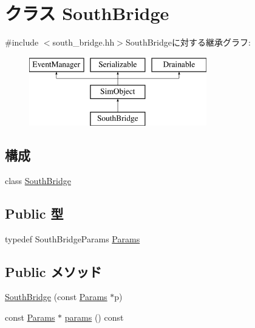 \hypertarget{classSouthBridge}{
\section{クラス SouthBridge}
\label{classSouthBridge}
}


{\ttfamily \#include $<$south\_\-bridge.hh$>$}SouthBridgeに対する継承グラフ:\begin{figure}[H]
\begin{center}
\leavevmode
\includegraphics[height=3cm]{classSouthBridge}
\end{center}
\end{figure}
\subsection*{構成}
\begin{DoxyCompactItemize}
\item 
class \hyperlink{classSouthBridge_1_1SouthBridge}{SouthBridge}
\end{DoxyCompactItemize}
\subsection*{Public 型}
\begin{DoxyCompactItemize}
\item 
typedef SouthBridgeParams \hyperlink{classSouthBridge_a627de7f454b8e2cbe120a7d6b67a4620}{Params}
\end{DoxyCompactItemize}
\subsection*{Public メソッド}
\begin{DoxyCompactItemize}
\item 
\hyperlink{classSouthBridge_a8a834d2de0708255ca2fa721d196c3f3}{SouthBridge} (const \hyperlink{classSouthBridge_a627de7f454b8e2cbe120a7d6b67a4620}{Params} $\ast$p)
\item 
const \hyperlink{classSouthBridge_a627de7f454b8e2cbe120a7d6b67a4620}{Params} $\ast$ \hyperlink{classSouthBridge_acd3c3feb78ae7a8f88fe0f110a718dff}{params} () const 
\end{DoxyCompactItemize}
